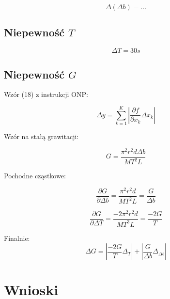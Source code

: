 \documentclass[a4paper,12pt]{article}
\begin{document}
$$
\Delta(\Delta b) = ... 
$$

\subsection{Niepewność $T$}

$$
\Delta T = 30 s
$$

\subsection{Niepewność $G$}

Wzór (18) z instrukcji ONP:

\begin{equation}
\label{eq:delta_y}
\Delta y = \sum_{k=1}^{K} \left| \frac{\partial f}{\partial x_k} \Delta x_k \right|
\end{equation}

Wzór na stałą grawitacji:

\begin{equation}
\label{eq:g}
G = \frac{\pi^2 r^2 d \Delta b}{MT^2L}
\end{equation}

Pochodne cząstkowe:

\begin{equation}
\frac{\partial G}{\partial \Delta b} = \frac{\pi^2 r^2 d}{MT^2L} = \frac{G}{\Delta b}
\end{equation}

\begin{equation}
\frac{\partial G}{\partial \Delta T} = \frac{-2\pi^2 r^2 d}{MT^3L} = \frac{-2G}{T}
\end{equation}

Finalnie:
\begin{equation}
\Delta G = | \frac{-2G}{T} \Delta_T | + | \frac{G}{\Delta b} \Delta_{\Delta b} |
\end{equation}

















\section{Wnioski}

\newpage
\end{document}
